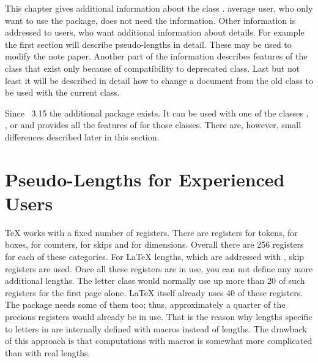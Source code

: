 This chapter gives additional information about the \KOMAScript{} class
.  average user, who only want to use the package,
does not need the information. Other information is addressed to users, who
want additional information about details. For example the first section will
describe pseudo-lengths in detail. These may be used to modify the note paper.
Another part of the information describes features of the class that exist
only because of compatibility to deprecated  class. Last but
not least it will be described in detail how to change a document from the old
 class to be used with the current  class.

%
Since \KOMAScript~3.15 the
additional package  exists. It can
be used with one of the \KOMAScript{} classes ,
, or  and provides all the features of
 for those classes. There are, however, small differences
described later in this section.%
%
%


\section{Pseudo-Lengths for Experienced Users}
\label{sec:scrlttr2-experts.pseudoLengths}

{\TeX} works with a fixed number of registers. There are registers for tokens,
for boxes, for counters, for skips and for dimensions.  Overall there are 256
registers for each of these categories. For {\LaTeX} lengths, which are
addressed with , skip registers are used. Once all these
registers are in use, you can not define any more additional lengths.  The
letter class  would normally use up more than 20 of such
registers for the first page alone. {\LaTeX} itself already uses 40 of these
registers. The  package needs some of them too; thus,
approximately a quarter of the precious registers would already be in
use. That is the reason why lengths specific to letters in 
are internally defined with macros instead of lengths. The drawback of this
approach is that computations with macros is somewhat more complicated than
with real lengths.

